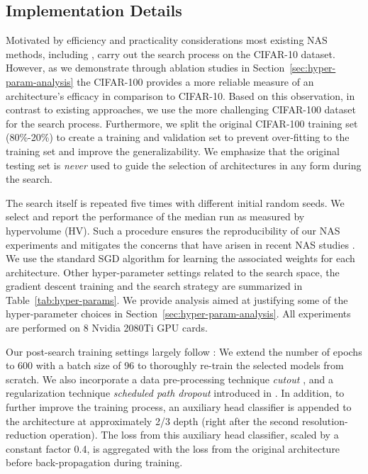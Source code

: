 \documentclass[journal]{IEEEtran}
\theoremstyle{definition}
\theoremstyle{remark}
\begin{document}
\subsection{Implementation Details\label{sec:implementation_detail}}
Motivated by efficiency and practicality considerations most existing NAS methods, including \cite{nasnet2018,real2019regularized,pmlr-v80-pham18a,ae-cnn},
carry out the search process on the CIFAR-10 dataset. However, as we demonstrate through ablation studies in  Section~\ref{sec:hyper-param-analysis} the CIFAR-100 provides a more reliable measure of an architecture's efficacy in comparison to CIFAR-10. Based on this observation, in contrast to existing approaches, we use the more challenging CIFAR-100 dataset for the search process. Furthermore, we split the original CIFAR-100 training set (80\%-20\%) to create a training and validation set to prevent over-fitting to the training set and improve the generalizability. We emphasize that the original testing set is \emph{never} used to guide the selection of architectures in any form during the search.

The search itself is repeated five times with different initial random seeds. We select and report the performance of the median run as measured by hypervolume (HV). Such a procedure ensures the reproducibility of our NAS experiments and mitigates the concerns that have arisen in recent NAS studies \cite{li2019random,xie2019exploring}. We use the standard SGD algorithm for learning the associated weights for each architecture. Other hyper-parameter settings related to the search space, the gradient descent training and the search strategy are summarized in Table~\ref{tab:hyper-params}. We provide analysis aimed at justifying some of the hyper-parameter choices in Section~\ref{sec:hyper-param-analysis}. All experiments are performed on 8 Nvidia 2080Ti GPU cards.

{
Our post-search training settings largely follow \cite{liu2018darts}: We extend the number of epochs to 600 with a batch size of 96 to thoroughly re-train the selected models from scratch. We also incorporate a data pre-processing technique \emph{cutout} \cite{cutout}, and a regularization technique \emph{scheduled path dropout} introduced in \cite{nasnet2018}. In addition, to further improve the training process, an auxiliary head classifier \cite{googlenet} is appended to the architecture at approximately 2/3 depth (right after the second resolution-reduction operation). The loss from this auxiliary head classifier, scaled by a constant factor 0.4, is aggregated with the loss from the original architecture before back-propagation during training.}
\end{document}
